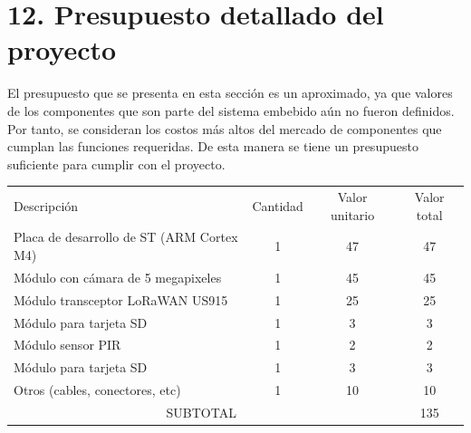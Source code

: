 \documentclass[
11pt, %
]{plan}
\begin{document}
\section{12. Presupuesto detallado del proyecto}
\label{sec:presupuesto}

El presupuesto que se presenta en esta sección es un aproximado, ya que valores de los componentes que son parte del sistema embebido aún no fueron definidos. Por tanto, se consideran los costos más altos del mercado de componentes que cumplan las funciones requeridas. De esta manera se tiene un presupuesto suficiente para cumplir con el proyecto.

\begin{table}[htpb]
\centering
\begin{tabularx}{\linewidth}{@{}|X|c|r|r|@{}}
\hline
\rowcolor[HTML]{C0C0C0}
\multicolumn{4}{|c|}{\cellcolor[HTML]{C0C0C0}COSTOS DIRECTOS} \\ \hline
\rowcolor[HTML]{C0C0C0}
Descripción &
 \multicolumn{1}{c|}{\cellcolor[HTML]{C0C0C0}Cantidad} &
 \multicolumn{1}{c|}{\cellcolor[HTML]{C0C0C0}Valor unitario} &
 \multicolumn{1}{c|}{\cellcolor[HTML]{C0C0C0}Valor total} \\ \hline
\multicolumn{1}{|l|}{Placa de desarrollo de ST (ARM Cortex M4)} &
\multicolumn{1}{|c|}{1} &
\multicolumn{1}{|c|}{47} &
\multicolumn{1}{|c|}{47}
  \\ \hline
\multicolumn{1}{|l|}{Módulo con cámara de 5 megapixeles} &
\multicolumn{1}{|c|}{1} &
\multicolumn{1}{|c|}{45} &
\multicolumn{1}{|c|}{45}
  \\ \hline
\multicolumn{1}{|l|}{Módulo transceptor LoRaWAN US915} &
\multicolumn{1}{|c|}{1} &
\multicolumn{1}{|c|}{25} &
\multicolumn{1}{|c|}{25}
  \\ \hline
\multicolumn{1}{|l|}{Módulo para tarjeta SD} &
\multicolumn{1}{|c|}{1} &
\multicolumn{1}{|c|}{3} &
\multicolumn{1}{|c|}{3}
  \\ \hline
\multicolumn{1}{|l|}{Módulo sensor PIR} &
\multicolumn{1}{|c|}{1} &
\multicolumn{1}{|c|}{2} &
\multicolumn{1}{|c|}{2}
  \\ \hline
\multicolumn{1}{|l|}{Módulo para tarjeta SD} &
\multicolumn{1}{|c|}{1} &
\multicolumn{1}{|c|}{3} &
\multicolumn{1}{|c|}{3}
  \\ \hline
\multicolumn{1}{|l|}{Otros (cables, conectores, etc)} &
\multicolumn{1}{|c|}{1} &
\multicolumn{1}{|c|}{10} &
\multicolumn{1}{|c|}{10}
  \\ \hline
\multicolumn{3}{|c|}{SUBTOTAL} &
 \multicolumn{1}{c|}{135} \\ \hline

\end{tabularx}
\end{table}
\end{document}
